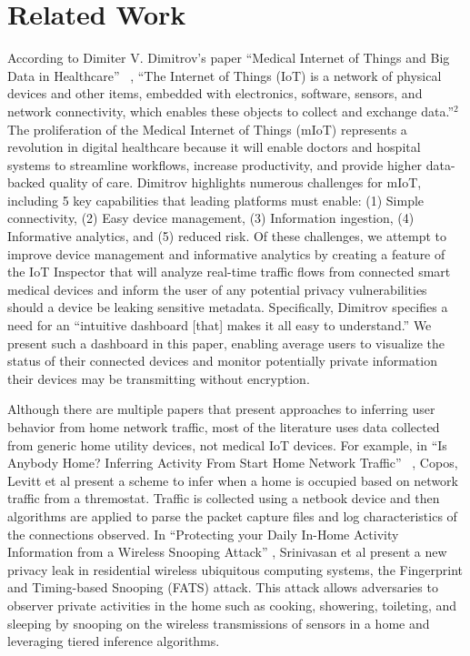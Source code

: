 
\section{Related Work}

According to Dimiter V. Dimitrov's paper ``Medical Internet of Things and Big Data in Healthcare'' ~\cite{dimitrovIoT}, ``The Internet of Things (IoT) is a network of physical devices and other items, embedded with electronics, software, sensors, and network connectivity, which enables these objects to collect and exchange data.''$^2$ The proliferation of the Medical Internet of Things (mIoT) represents a revolution in digital healthcare because it will enable doctors and hospital systems to streamline workflows, increase productivity, and provide higher data-backed quality of care. Dimitrov highlights numerous challenges for mIoT, including 5 key capabilities that leading platforms must enable: (1) Simple connectivity, (2) Easy device management, (3) Information ingestion, (4) Informative analytics, and (5) reduced risk. Of these challenges, we attempt to improve device management and informative analytics by creating a feature of the IoT Inspector that will analyze real-time traffic flows from connected smart medical devices and inform the user of any potential privacy vulnerabilities should a device be leaking sensitive metadata. Specifically, Dimitrov specifies a need for an ``intuitive dashboard [that] makes it all easy to understand.'' We present such a dashboard in this paper, enabling average users to visualize the status of their connected devices and monitor potentially private information their devices may be transmitting without encryption. 

Although there are multiple papers that present approaches to inferring user behavior from home network traffic, most of the literature uses data collected from generic home utility devices, not medical IoT devices. For example, in ``Is Anybody Home? Inferring Activity From Start Home Network Traffic'' ~\cite{coposIoT}, Copos, Levitt et al present a scheme to infer when a home is occupied based on network traffic from a thremostat. Traffic is collected using a netbook device and then algorithms are applied to parse the packet capture files and log characteristics of the connections observed. In ``Protecting your Daily In-Home Activity Information from a Wireless Snooping Attack'' \cite{srinivasan2008fats}, Srinivasan et al present a new privacy leak in residential wireless ubiquitous computing systems, the Fingerprint and Timing-based Snooping (FATS) attack. This attack allows adversaries to observer private activities in the home such as cooking, showering, toileting, and sleeping by snooping on the wireless transmissions of sensors in a home and leveraging tiered inference algorithms.

